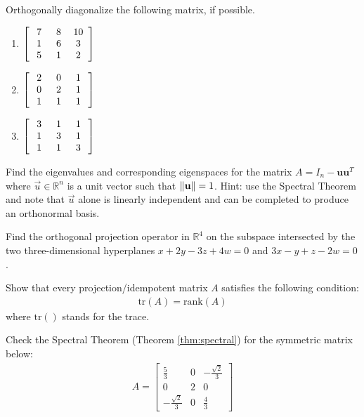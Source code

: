 \begin{Exercise}
Orthogonally diagonalize the following matrix, if possible.
\begin{enumerate}[label=(\alph*)]
\item $\left[\begin{array}{wc{10pt}wc{10pt}wc{10pt}}
7 & 8 & 10\\
1 & 6 & 3\\
5 & 1 & 2
\end{array}\right]$
\item $\left[\begin{array}{wc{10pt}wc{10pt}wc{10pt}}
2 & 0 & 1\\
0 & 2 & 1\\
1 & 1 & 1
\end{array}\right]$
\item $\left[\begin{array}{wc{10pt}wc{10pt}wc{10pt}}
3 & 1 & 1\\
1 & 3 & 1\\
1 & 1 & 3
\end{array}\right]$
\end{enumerate}
\end{Exercise}

\begin{Exercise}
Find the eigenvalues and corresponding eigenspaces for the matrix $A = I_n - \textbf{u}\textbf{u}^T$ where $\vec{u} \in \mathbb{R}^n$ is a unit vector such that $\norm{\textbf{u}} = 1$. Hint: use the Spectral Theorem and note that $\vec{u}$ alone is linearly independent and can be completed to produce an orthonormal basis.
\end{Exercise}

\begin{Exercise}
Find the orthogonal projection operator in $\mathbb{R}^4$ on the subspace intersected by the two three-dimensional hyperplanes $x + 2y - 3z + 4w = 0$ and $3x - y + z - 2w = 0$.
\end{Exercise}

\begin{Exercise}
Show that every projection/idempotent matrix $A$ satisfies the following condition:
\begin{align*}
\text{tr}(A) = \text{rank}(A)
\end{align*}
where $\text{tr}()$ stands for the trace.
\end{Exercise}

\begin{Exercise}
Check the Spectral Theorem (Theorem \ref{thm:spectral}) for the symmetric matrix below:
\begin{align*}
A = 
\begin{bmatrix}
\frac{5}{3}&0&-\frac{\sqrt{2}}{3}\\ 
0&2&0\\ 
-\frac{\sqrt{2}}{3}&0&\frac{4}{3}
\end{bmatrix}
\end{align*}
\end{Exercise}

